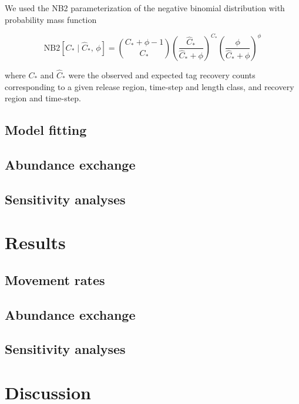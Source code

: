 \documentclass{article}
\begin{document}

We used the NB2 parameterization of the negative binomial distribution with probability mass function

\begin{equation}
  \label{eq:sampling}
  \mathrm{NB2} \! \left[ C_* \mid \widehat{C}_*,\, \phi \right] = \binom{C_* + \phi - 1}{C_*} \left(\frac{\widehat{C}_*}{\widehat{C}_* + \phi}\right)^{C_*} \left( \frac{\phi}{\widehat{C}_* + \phi} \right)^{\phi}
\end{equation}

\noindent where $C_*$ and $\widehat{C}_*$ were the observed and expected tag recovery counts corresponding to a given release region, time-step and length class, and recovery region and time-step.

\subsection{Model fitting}

\subsection{Abundance exchange}

\subsection{Sensitivity analyses}

\section{Results}

\subsection{Movement rates}

\subsection{Abundance exchange}

\subsection{Sensitivity analyses}

\section{Discussion}
\end{document}
